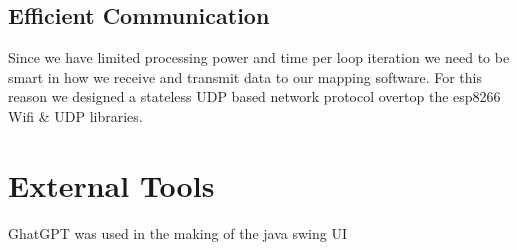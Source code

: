 \documentclass[conference]{IEEEtran}
\begin{document}
\subsection{Efficient Communication}
Since we have limited processing power and time per loop iteration we need to be smart in how we receive and transmit data to our mapping software. For this reason we designed a stateless UDP based network protocol overtop the esp8266 Wifi \& UDP libraries. \cite{wifi_lib}

\section{External Tools}
GhatGPT was used in the making of the java swing UI

\nocite{*}


\end{document}
